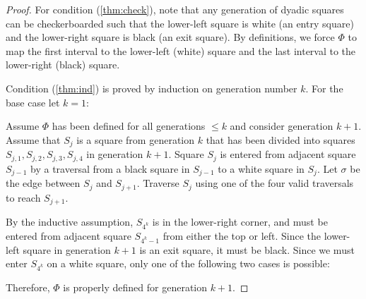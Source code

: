 \documentclass[letterpaper,12pt,fleqn,reqno]{amsart}
\theoremstyle{plain}
\begin{document}
\begin{proof}
For condition (\ref{thm:check}), note that any generation of dyadic squares can
be checkerboarded such that the lower-left square is white (an entry square)
and the lower-right square is black (an exit square). By definitions, we force
$\Phi$ to map the first interval to the lower-left (white) square and the last
interval to the lower-right (black) square.

Condition (\ref{thm:ind}) is proved by induction on generation number $k$. For
the base case let $k=1$:

\begin{center}
\end{center}

Assume $\Phi$ has been defined for all generations $\le k$ and consider
generation $k+1$. Assume that $S_j$ is a square from generation $k$ that has
been divided into squares $S_{j,1}, S_{j,2}, S_{j,3}, S_{j,4}$ in generation $k+1$.
Square $S_j$ is entered from adjacent square $S_{j-1}$ by a traversal from a
black square in $S_{j-1}$ to a white square in $S_j$. Let $\sigma$ be the edge
between $S_j$ and $S_{j+1}$. Traverse $S_j$ using one of the four valid
traversals to reach $S_{j+1}$.

By the inductive assumption, $S_{4^k}$ is in the lower-right corner, and must be
entered from adjacent square $S_{4^k-1}$ from either the top or left. Since the
lower-left square in generation $k+1$ is an exit square, it must be black.
Since we must enter $S_{4^k}$ on a white square, only one of the following two
cases is possible:

\bigskip


\bigskip


\bigskip

Therefore, $\Phi$ is properly defined for generation $k+1$.
\end{proof}
\end{document}
